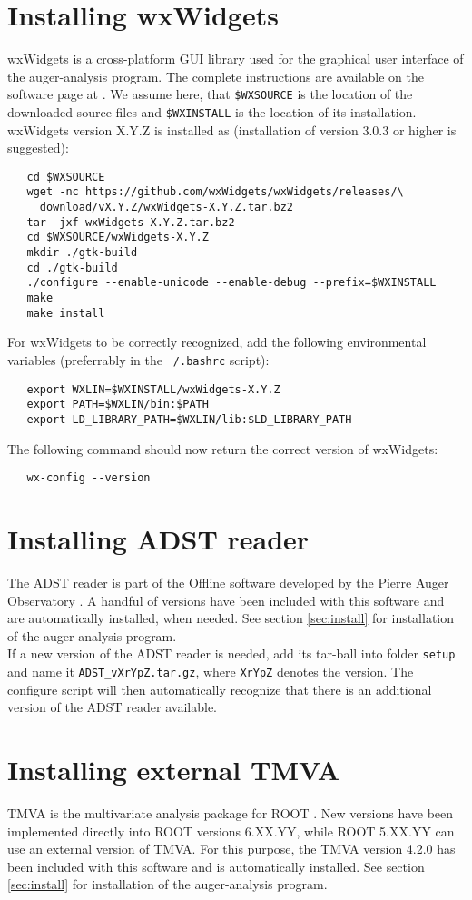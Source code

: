 \documentclass[12pt,a4paper]{report}
\begin{document}
\section{Installing wxWidgets}
wxWidgets is a cross-platform GUI library used for the graphical user interface of the auger-analysis program. The complete instructions are available on the software page at \cite{wxWidgets}. We assume here, that \texttt{\$WXSOURCE} is the location of the downloaded source files and \texttt{\$WXINSTALL} is the location of its installation.\\
wxWidgets version X.Y.Z is installed as (installation of version 3.0.3 or higher is suggested):
\begin{verbatim}
   cd $WXSOURCE
   wget -nc https://github.com/wxWidgets/wxWidgets/releases/\
     download/vX.Y.Z/wxWidgets-X.Y.Z.tar.bz2
   tar -jxf wxWidgets-X.Y.Z.tar.bz2
   cd $WXSOURCE/wxWidgets-X.Y.Z
   mkdir ./gtk-build
   cd ./gtk-build
   ./configure --enable-unicode --enable-debug --prefix=$WXINSTALL
   make
   make install
\end{verbatim}
For wxWidgets to be correctly recognized, add the following environmental variables (preferrably in the \texttt{~/.bashrc} script):
\begin{verbatim}
   export WXLIN=$WXINSTALL/wxWidgets-X.Y.Z
   export PATH=$WXLIN/bin:$PATH
   export LD_LIBRARY_PATH=$WXLIN/lib:$LD_LIBRARY_PATH
\end{verbatim}
The following command should now return the correct version of wxWidgets:
\begin{verbatim}
   wx-config --version
\end{verbatim}

\section{Installing ADST reader}
The ADST reader is part of the Offline software developed by the Pierre Auger Observatory \cite{offline}. A handful of versions have been included with this software and are automatically installed, when needed. See section \ref{sec:install} for installation of the auger-analysis program.\\
If a new version of the ADST reader is needed, add its tar-ball into folder \texttt{setup} and name it \texttt{ADST\_vXrYpZ.tar.gz}, where \texttt{XrYpZ} denotes the version. The configure script will then automatically recognize that there is an additional version of the ADST reader available.

\section{Installing external TMVA}
TMVA is the multivariate analysis package for ROOT \cite{tmva}. New versions have been implemented directly into ROOT versions 6.XX.YY, while ROOT 5.XX.YY can use an external version of TMVA. For this purpose, the TMVA version 4.2.0 has been included with this software and is automatically installed. See section \ref{sec:install} for installation of the auger-analysis program.
\end{document}
